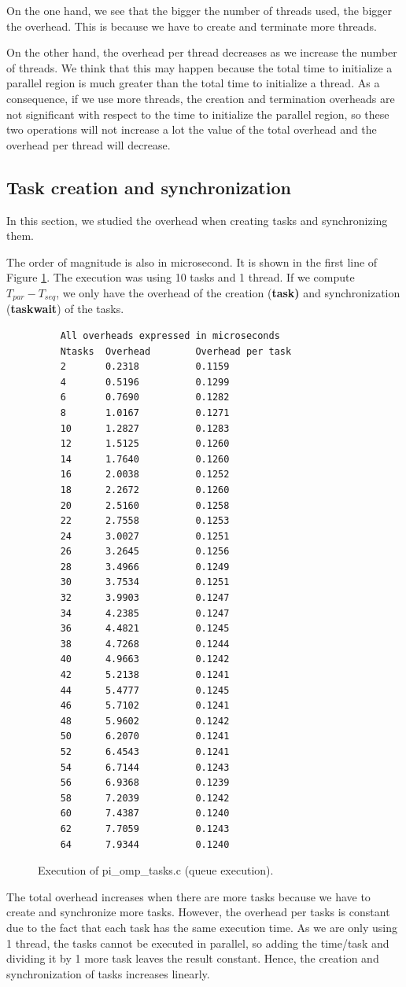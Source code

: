 \documentclass[12pt, a4paper]{article}
\begin{document}
On the one hand, we see that the bigger the number of threads used, the bigger the overhead. This is because we have to create and terminate more threads.

On the other hand, the overhead per thread decreases as we increase the number of threads. We think that this may happen because the total time to initialize a parallel region is much greater than the total time to initialize a thread. As a consequence, if we use more threads, the creation and termination overheads are not significant with respect to the time to initialize the parallel region, so these two operations will not increase a lot the value of the total overhead and the overhead per thread will decrease.

\subsection{Task creation and synchronization}

In this section, we studied the overhead when creating tasks and synchronizing them.

The order of magnitude is also in microsecond. It is shown in the first line of Figure \ref{piomptasks}. The execution was using 10 tasks and 1 thread. If we compute $T_{par} - T_{seq}$, we only have the overhead of the creation (\textbf{task)} and synchronization (\textbf{taskwait}) of the tasks.

\begin{figure}[H]
\begin{lstlisting}
	All overheads expressed in microseconds
	Ntasks  Overhead        Overhead per task
	2       0.2318          0.1159
	4       0.5196          0.1299
	6       0.7690          0.1282
	8       1.0167          0.1271
	10      1.2827          0.1283
	12      1.5125          0.1260
	14      1.7640          0.1260
	16      2.0038          0.1252
	18      2.2672          0.1260
	20      2.5160          0.1258
	22      2.7558          0.1253
	24      3.0027          0.1251
	26      3.2645          0.1256
	28      3.4966          0.1249
	30      3.7534          0.1251
	32      3.9903          0.1247
	34      4.2385          0.1247
	36      4.4821          0.1245
	38      4.7268          0.1244
	40      4.9663          0.1242
	42      5.2138          0.1241
	44      5.4777          0.1245
	46      5.7102          0.1241
	48      5.9602          0.1242
	50      6.2070          0.1241
	52      6.4543          0.1241
	54      6.7144          0.1243
	56      6.9368          0.1239
	58      7.2039          0.1242
	60      7.4387          0.1240
	62      7.7059          0.1243
	64      7.9344          0.1240
	\end{lstlisting}
	\caption{Execution of pi\_omp\_tasks.c (queue execution).}
	\label{piomptasks}
\end{figure}

The total overhead increases when there are more tasks because we have to create and synchronize more tasks. However, the overhead per tasks is constant due to the fact that each task has the same execution time. As we are only using 1 thread, the tasks cannot be executed in parallel, so adding the time/task and dividing it by 1 more task leaves the result constant. Hence, the creation and synchronization of tasks increases linearly.
\end{document}
